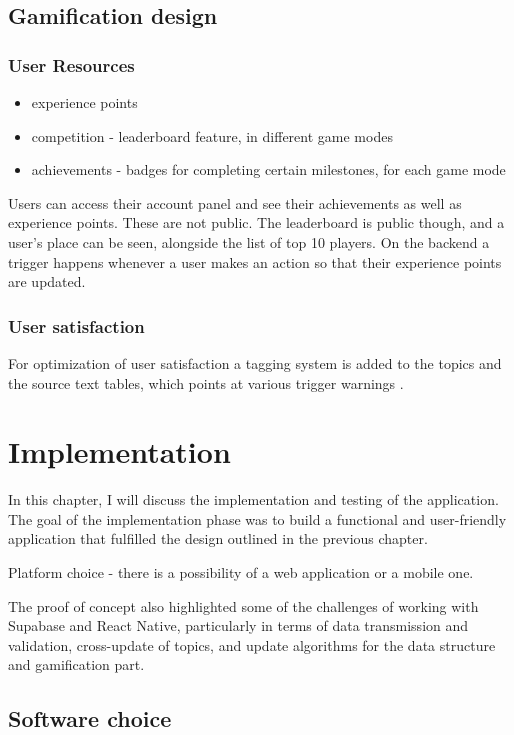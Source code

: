 \documentclass{report}
\begin{document}
\section{Gamification design}
\subsection{User Resources}
\begin{itemize}
  \item experience points 
  \item competition - leaderboard feature, in different game modes
  \item achievements - badges for completing certain milestones, for each game mode
\end{itemize}

Users can access their account panel and see their achievements as well as experience points. These are not public. The leaderboard is public though, and a user's place can be seen, alongside the list of top 10 players. On the backend a trigger happens whenever a user makes an action so that their experience points are updated.
\subsection{User satisfaction}
For optimization of user satisfaction a tagging system is added to the topics and the source text tables, which points at various trigger warnings \cite{annemieke_small_2019}.
\newpage

\chapter{Implementation}

In this chapter, I will discuss the implementation and testing of the application. The goal of the implementation phase was to build a functional and user-friendly application that fulfilled the design outlined in the previous chapter.

Platform choice - there is a possibility of a web application or a mobile one.

The proof of concept also highlighted some of the challenges of working with Supabase and React Native, particularly in terms of data transmission and validation, cross-update of topics, and update algorithms for the data structure and gamification part.

\section{Software choice}
\end{document}
